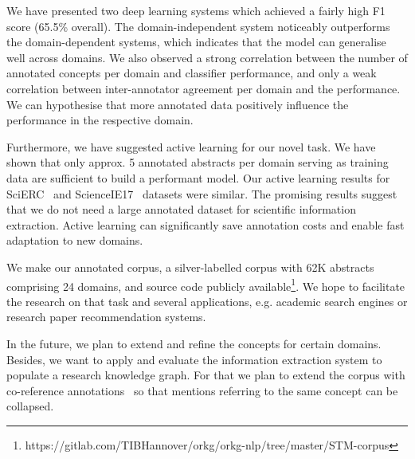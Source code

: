 \documentclass[runningheads]{llncs}
\begin{document}
We have presented two deep learning systems which achieved a fairly high F1 score (65.5\% overall). The domain-independent system noticeably outperforms the domain-dependent systems, which indicates that the model can generalise well across domains. We also observed a strong correlation between the number of annotated concepts per domain and classifier performance, and only a weak correlation between inter-annotator agreement per domain and the performance. We can hypothesise that more annotated data positively influence the performance in the respective domain.

Furthermore, we have suggested active learning for our novel task. We have shown that only approx. 5 annotated abstracts per domain serving as training data are sufficient to build a performant model. Our active learning results for SciERC~\cite{Luan2018MultiTaskIO} and ScienceIE17~\cite{augenstein2017semeval} datasets were similar.
The promising results suggest that we do not need a large annotated dataset for scientific information extraction. Active learning can significantly save annotation costs and enable fast adaptation to new domains.

We make our annotated corpus, a silver-labelled corpus with 62K abstracts comprising 24 domains, and source code publicly available\footnote{https://gitlab.com/TIBHannover/orkg/orkg-nlp/tree/master/STM-corpus}. We hope to facilitate the research on that task and several applications, e.g. academic search engines or research paper recommendation systems.
 
In the future, we plan to extend and refine the concepts for certain domains.
Besides, we want to apply and evaluate the information extraction system to populate a research knowledge graph.
For that we plan to extend the corpus with co-reference annotations~\cite{Lee2017EndtoendNC} so that mentions referring to the same concept can be collapsed.





\end{document}
